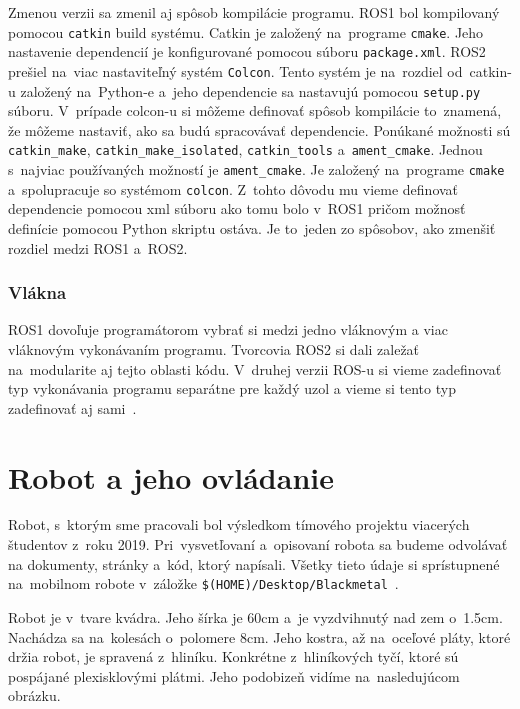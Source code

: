 	Zmenou verzii sa zmenil aj spôsob kompilácie programu. ROS1 bol kompilovaný pomocou \texttt{catkin} build systému. Catkin je založený
	na~programe \texttt{cmake}. Jeho nastavenie dependencií je konfigurované pomocou súboru \texttt{package.xml}. ROS2 prešiel na~viac
	nastaviteľný systém \texttt{Colcon}. Tento systém je na~rozdiel od~catkin-u založený na~Python-e a~jeho dependencie sa nastavujú pomocou
	\texttt{setup.py} súboru. V~prípade colcon-u si môžeme definovať spôsob kompilácie to~znamená, že môžeme nastaviť, ako sa budú spracovávať
	dependencie. Ponúkané možnosti sú \texttt{catkin\_make}, \texttt{catkin\_make\_isolated}, \texttt{catkin\_tools} a~\texttt{ament\_cmake}.
	Jednou s~najviac používaných možností je \texttt{ament\_cmake}. Je založený na~programe \texttt{cmake} a~spolupracuje so systémom \texttt{colcon}.
	Z~tohto dôvodu mu vieme definovať dependencie pomocou xml súboru ako tomu bolo v~ROS1 pričom možnosť definície pomocou Python skriptu ostáva.
	Je to~jeden zo spôsobov, ako zmenšiť rozdiel medzi ROS1 a~ROS2.

\subsubsection{Vlákna}

	ROS1 dovoľuje programátorom vybrať si medzi jedno vláknovým a viac vláknovým vykonávaním programu. Tvorcovia ROS2 si dali zaležať na~modularite
	aj tejto oblasti kódu. V~druhej verzii ROS-u si vieme zadefinovať typ vykonávania programu separátne pre každý uzol a vieme si tento typ
	zadefinovať aj sami~\cite{ROS2design}.

\section{Robot a jeho ovládanie}

Robot, s~ktorým sme pracovali bol výsledkom tímového projektu viacerých študentov \newline z~roku 2019. Pri~vysvetľovaní a~opisovaní robota sa budeme
odvolávať na dokumenty, stránky a~kód, ktorý napísali. Všetky tieto údaje si sprístupnené na~mobilnom robote v~záložke
\newline \texttt{\$(HOME)/Desktop/Blackmetal}~\cite{timovyProjekt}.

Robot je v~tvare kvádra. Jeho šírka je 60cm a~je vyzdvihnutý nad zem o~1.5cm. Nachádza sa na~kolesách o~polomere 8cm. Jeho kostra, až na~oceľové pláty,
ktoré držia robot, je spravená z~hliníku. Konkrétne z~hliníkových tyčí, ktoré sú pospájané plexisklovými plátmi. Jeho podobizeň vidíme na~nasledujúcom
obrázku.

